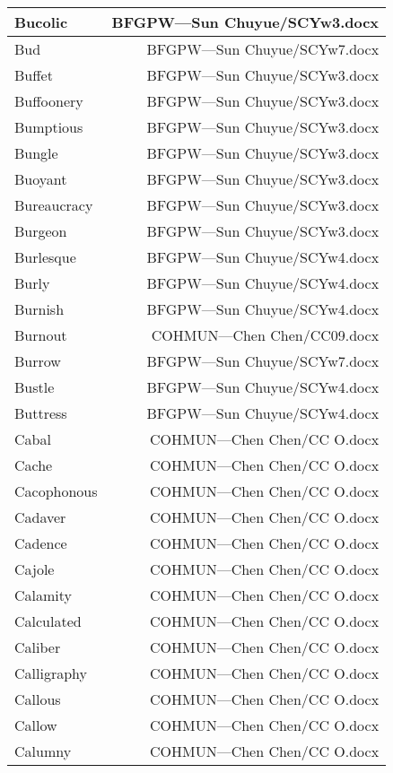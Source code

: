 \documentclass{article}
\begin{document}
\begin{center}
\begin{longtable}{|l|r|}
Bucolic  &  BFGPW---Sun Chuyue/SCYw3.docx\\  
\hline
Bud  &  BFGPW---Sun Chuyue/SCYw7.docx\\  
\hline
Buffet  &  BFGPW---Sun Chuyue/SCYw3.docx\\  
\hline
Buffoonery  &  BFGPW---Sun Chuyue/SCYw3.docx\\  
\hline
Bumptious  &  BFGPW---Sun Chuyue/SCYw3.docx\\  
\hline
Bungle  &  BFGPW---Sun Chuyue/SCYw3.docx\\  
\hline
Buoyant  &  BFGPW---Sun Chuyue/SCYw3.docx\\  
\hline
Bureaucracy  &  BFGPW---Sun Chuyue/SCYw3.docx\\  
\hline
Burgeon  &  BFGPW---Sun Chuyue/SCYw3.docx\\  
\hline
Burlesque  &  BFGPW---Sun Chuyue/SCYw4.docx\\  
\hline
Burly  &  BFGPW---Sun Chuyue/SCYw4.docx\\  
\hline
Burnish  &  BFGPW---Sun Chuyue/SCYw4.docx\\  
\hline
Burnout  &  COHMUN---Chen Chen/CC09.docx\\  
\hline
Burrow  &  BFGPW---Sun Chuyue/SCYw7.docx\\  
\hline
Bustle  &  BFGPW---Sun Chuyue/SCYw4.docx\\  
\hline
Buttress  &  BFGPW---Sun Chuyue/SCYw4.docx\\  
\hline
Cabal  &  COHMUN---Chen Chen/CC O.docx\\  
\hline
Cache  &  COHMUN---Chen Chen/CC O.docx\\  
\hline
Cacophonous  &  COHMUN---Chen Chen/CC O.docx\\  
\hline
Cadaver  &  COHMUN---Chen Chen/CC O.docx\\  
\hline
Cadence  &  COHMUN---Chen Chen/CC O.docx\\  
\hline
Cajole  &  COHMUN---Chen Chen/CC O.docx\\  
\hline
Calamity  &  COHMUN---Chen Chen/CC O.docx\\  
\hline
Calculated  &  COHMUN---Chen Chen/CC O.docx\\  
\hline
Caliber  &  COHMUN---Chen Chen/CC O.docx\\  
\hline
Calligraphy  &  COHMUN---Chen Chen/CC O.docx\\  
\hline
Callous  &  COHMUN---Chen Chen/CC O.docx\\  
\hline
Callow  &  COHMUN---Chen Chen/CC O.docx\\  
\hline
Calumny  &  COHMUN---Chen Chen/CC O.docx\\  

\end{longtable}
\end{center}
\end{document}
